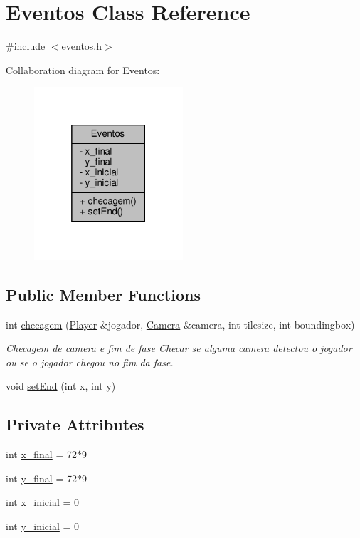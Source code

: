 \hypertarget{classEventos}{}\section{Eventos Class Reference}
\label{classEventos}


{\ttfamily \#include $<$eventos.\+h$>$}



Collaboration diagram for Eventos\+:
\nopagebreak
\begin{figure}[H]
\begin{center}
\leavevmode
\includegraphics[width=157pt]{classEventos__coll__graph}
\end{center}
\end{figure}
\subsection*{Public Member Functions}
\begin{DoxyCompactItemize}
\item 
int \hyperlink{classEventos_af534be40ac7143eb360a575296ec6b06}{checagem} (\hyperlink{classPlayer}{Player} \&jogador, \hyperlink{classCamera}{Camera} \&camera, int tilesize, int boundingbox)
\begin{DoxyCompactList}\small\item\em Checagem de camera e fim de fase Checar se alguma camera detectou o jogador ou se o jogador chegou no fim da fase. \end{DoxyCompactList}\item 
void \hyperlink{classEventos_a9d2ebdf756c3bb3b0bfe6ad2f73f1202}{set\+End} (int x, int y)
\end{DoxyCompactItemize}
\subsection*{Private Attributes}
\begin{DoxyCompactItemize}
\item 
int \hyperlink{classEventos_afdf3e21f837f2a84c5d258383ada6c29}{x\+\_\+final} = 72$\ast$9
\item 
int \hyperlink{classEventos_a52967e28579a67b2fef4ed6d427a042d}{y\+\_\+final} = 72$\ast$9
\item 
int \hyperlink{classEventos_aa09d32f02896554a3409d0093114cab1}{x\+\_\+inicial} = 0
\item 
int \hyperlink{classEventos_a42c55facc39e42b7c816a06b3009e228}{y\+\_\+inicial} = 0
\end{DoxyCompactItemize}


